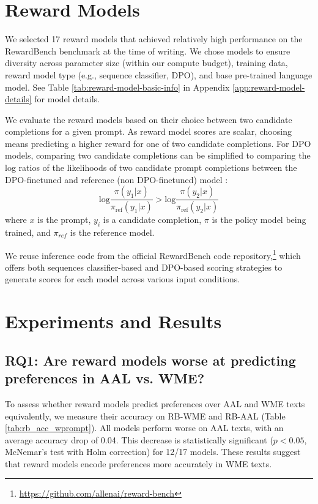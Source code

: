 \section{Reward Models}
We selected 17 reward models that achieved relatively high performance on the RewardBench benchmark \cite{lambert_rewardbench_2024} at the time of writing. We chose models to ensure diversity across parameter size (within our compute budget), training data, reward model type (e.g., sequence classifier, DPO), and base pre-trained language model. See Table \ref{tab:reward-model-basic-info} in Appendix \ref{app:reward-model-details} for model details. 

We evaluate the reward models based on their choice between two candidate completions for a given prompt. As reward model scores are scalar, choosing means predicting a higher reward for one of two candidate completions. For DPO models, comparing two candidate completions can be simplified to comparing the log ratios of the likelihoods of two candidate prompt completions between the DPO-finetuned and reference (non DPO-finetuned) model \cite{lambert_rewardbench_2024}:
\begin{equation}
 \text{log}\frac{\pi(y_1|x)}{\pi_{\text{ref}}(y_1|x)} > \text{log}\frac{\pi(y_2|x)}{\pi_{\text{ref}}(y_2|x)}
\end{equation}
where $x$ is the prompt, $y_i$ is a candidate completion, $\pi$ is the policy model being trained, and $\pi_{ref}$ is the reference model.

We reuse inference code from the official RewardBench code repository,\footnote{\url{https://github.com/allenai/reward-bench}} which offers both sequences classifier-based and DPO-based scoring strategies to generate scores for each model across various input conditions. 

\section{Experiments and Results}
\subsection{RQ1: Are reward models worse at predicting preferences in AAL vs. WME?}
\label{RQ1}

To assess whether reward models predict preferences over AAL and WME texts equivalently, we measure their accuracy on \textsc{RB-WME} and \textsc{RB-AAL} (Table \ref{tab:rb_acc_wprompt}). All models perform worse on AAL texts, with an average accuracy drop of 0.04. This decrease is statistically significant ($p<0.05$, McNemar's test with Holm correction) for 12/17 models. These results suggest that reward models encode preferences more accurately in WME texts.

